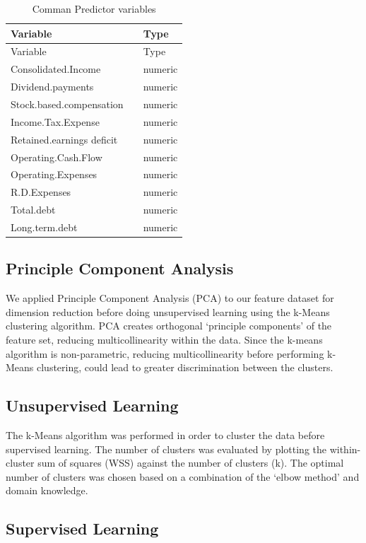 \documentclass[11pt,]{article}
\begin{document}
\begin{longtable}[]{@{}lll@{}}
\caption{Comman Predictor variables}\tabularnewline
\toprule
Variable & & Type\tabularnewline
\midrule
\endfirsthead
\toprule
Variable & & Type\tabularnewline
\midrule
\endhead
Consolidated.Income & & numeric\tabularnewline
Dividend.payments & & numeric\tabularnewline
Stock.based.compensation & & numeric\tabularnewline
Income.Tax.Expense & & numeric\tabularnewline
Retained.earnings deficit & & numeric\tabularnewline
Operating.Cash.Flow & & numeric\tabularnewline
Operating.Expenses & & numeric\tabularnewline
R.D.Expenses & & numeric\tabularnewline
Total.debt & & numeric\tabularnewline
Long.term.debt & & numeric\tabularnewline
\bottomrule
\end{longtable}

\hypertarget{principle-component-analysis}{%
\subsection{Principle Component
Analysis}\label{principle-component-analysis}}

We applied Principle Component Analysis (PCA) to our feature dataset for
dimension reduction before doing unsupervised learning using the k-Means
clustering algorithm. PCA creates orthogonal `principle components' of
the feature set, reducing multicollinearity within the data. Since the
k-means algorithm is non-parametric, reducing multicollinearity before
performing k-Means clustering, could lead to greater discrimination
between the clusters.

\hypertarget{unsupervised-learning}{%
\subsection{Unsupervised Learning}\label{unsupervised-learning}}

The k-Means algorithm was performed in order to cluster the data before
supervised learning. The number of clusters was evaluated by plotting
the within-cluster sum of squares (WSS) against the number of clusters
(k). The optimal number of clusters was chosen based on a combination of
the `elbow method' and domain knowledge.

\hypertarget{supervised-learning}{%
\subsection{Supervised Learning}\label{supervised-learning}}
\end{document}

